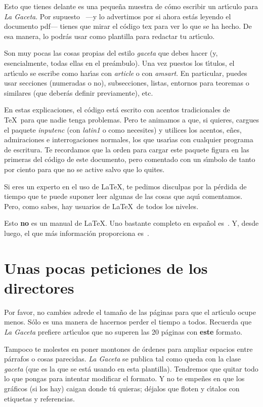 \documentclass[autocontact]{gaceta}
\begin{document}
Esto que tienes delante es una peque\~na muestra de c\'omo escribir un art\'{\i}culo para \textit{La Gaceta}. Por supuesto ~---y lo advertimos por si ahora est\'as leyendo el documento pdf--- tienes que mirar el c\'odigo tex para ver lo que se ha hecho. De esa manera, lo podr\'as usar como plantilla para redactar tu art\'{\i}culo.

Son muy pocas las cosas propias del estilo \textit{gaceta} que debes hacer (y, esencialmente, todas ellas en el pre\'ambulo).
Una vez puestos los t\'{\i}tulos, el art\'{\i}culo se escribe como har\'{\i}as con \textit{article} o con \textit{amsart}. En particular, puedes usar secciones (numeradas o no), subsecciones, listas, entornos para teoremas o similares (que deber\'as definir previamente), etc.

En estas explicaciones, el c\'odigo est\'a escrito con acentos tradicionales de \TeX\ para que nadie tenga problemas. Pero te animamos a que, si quieres, cargues el paquete \textit{inputenc} (con \textit{latin1} o como necesites) y utilices los acentos, e\~nes, admiraciones e interrogaciones normales, los que usar\'{\i}as con cualquier programa de escritura. Te recordamos que la orden para cargar este paquete figura en las primeras del c\'odigo de este documento, pero comentado con un s\'{\i}mbolo de tanto por ciento para que no se active salvo que lo quites.

Si eres un experto en el uso de \LaTeX, te pedimos disculpas por la p\'erdida de tiempo que te puede suponer leer algunas de las cosas que aqu\'{\i} comentamos. Pero, como sabes, hay usuarios de \LaTeX\ de todos los niveles.

Esto \textbf{no} es un manual de \LaTeX. Uno bastante completo en espa\~nol es~\cite{latex-imprenta}. Y, desde luego, el que m\'as informaci\'on proporciona es~\cite{latex-companion}.

\section{Unas pocas peticiones de los directores}

Por favor, no cambies adrede el tama\~no de las p\'aginas para que el art\'{\i}culo ocupe menos. S\'olo es una manera de hacernos perder el tiempo a todos. Recuerda que \textit{La Gaceta} prefiere art\'{\i}culos que no superen las 20 p\'aginas con \textbf{este} formato.

Tampoco te molestes en poner montones de \'ordenes para ampliar espacios entre p\'arrafos o cosas parecidas. \textit{La Gaceta} se publica tal como queda con la clase \textit{gaceta} (que es la que se est\'a usando en esta plantilla). Tendremos que quitar todo lo que pongas para intentar modificar el formato. Y no te empe\~nes en que los gr\'aficos (si los hay) caigan donde t\'u quieras; d\'ejalos que floten y c\'{\i}talos con etiquetas y referencias.
\end{document}
